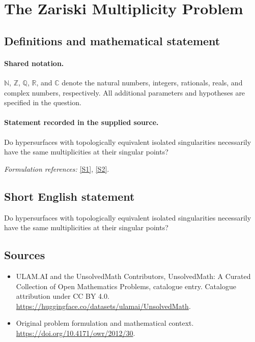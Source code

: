 \documentclass[11pt]{article}
\newcommand{\sref}[2]{\hyperlink{source:#1:#2}{[S#2]}}
\begin{document}
\section{The Zariski Multiplicity Problem}\label{statement}

\subsection{Definitions and mathematical statement}

\paragraph{Shared notation.}$\mathbb N$, $\mathbb Z$, $\mathbb Q$, $\mathbb R$, and $\mathbb C$ denote the natural numbers, integers, rationals, reals, and complex numbers, respectively. All additional parameters and hypotheses are specified in the question.


\paragraph{Statement recorded in the supplied source.}
Do hypersurfaces with topologically equivalent isolated singularities necessarily have the same multiplicities at their singular points?
\par\smallskip\textit{Formulation references:} \sref{statement}{1}, \sref{statement}{2}.
\subsection{Short English statement}
Do hypersurfaces with topologically equivalent isolated singularities necessarily have the same multiplicities at their singular points?
\subsection{Sources}
\begin{itemize}
\item[\hypertarget{source:statement:1}{S1}] ULAM.AI and the UnsolvedMath Contributors, UnsolvedMath: A Curated Collection of Open Mathematics Problems, catalogue entry. Catalogue attribution under CC BY 4.0.
\url{https://huggingface.co/datasets/ulamai/UnsolvedMath}.
\item[\hypertarget{source:statement:2}{S2}] Original problem formulation and mathematical context.
\url{https://doi.org/10.4171/owr/2012/30}.
\end{itemize}
\label{end:statement}
\end{document}
